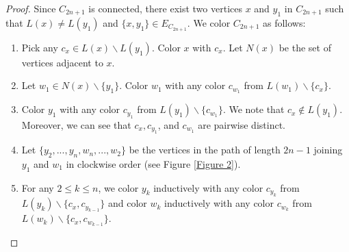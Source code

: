 \documentclass[12pt,reqno,a4paper]{amsart}
\theoremstyle{definition}
\begin{document}
\begin{proof}
Since $C_{2n+1}$ is connected, there exist two vertices $x$ and $y_{1}$ in $C_{2n+1}$ such that $L(x)\neq L(y_{1})$ and $\{x,y_{1}\}\in E_{C_{2n+1}}$. We color $C_{2n+1}$ as follows:

\begin{enumerate}
\item[$(a)$] Pick any $c_{x}\in L(x)\backslash L(y_{1})$. Color $x$ with $c_{x}$. Let $N(x)$ be the set of vertices adjacent to $x$.
\item[$(b)$] Let $w_{1}\in N(x)\backslash \{y_{1}\}$. Color $w_{1}$ with any color $c_{w_{1}}$ from $L(w_{1})\backslash\{c_{x}\}$. 
\item[$(c)$] Color $y_{1}$ with any color $c_{y_{1}}$ from $L(y_{1})\backslash\{c_{w_{1}}\}$. We note that $c_{x}\not\in L(y_{1})$. Moreover, we can see that $c_{x}, c_{y_{1}}$, and $c_{w_{1}}$ are pairwise distinct.
\item[$(d)$] Let $\{y_{2},...,y_{n}, w_{n},...,w_{2}\}$ be the vertices in the path of length $2n-1$ joining $y_{1}$ and $w_{1}$ in clockwise order (see Figure \ref{Figure 2}).
\item[$(e)$] For any $2\leq k\leq n$, we color $y_{k}$ inductively with any color $c_{y_{k}}$ from $L(y_{k})\backslash\{c_{x}, c_{y_{k-1}}\}$ and color $w_{k}$ inductively with any color $c_{w_{k}}$ from $L(w_{k})\backslash\{c_{x}, c_{w_{k-1}}\}$.
\end{enumerate}
\begin{figure}[!ht]
\centering
\begin{minipage}{\textwidth}
\centering
{}
\end{minipage}
\end{figure}
\end{proof}
\end{document}
